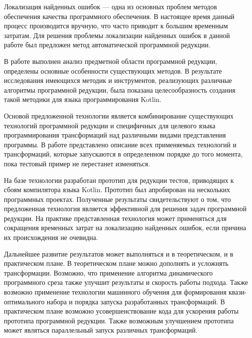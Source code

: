 \conclusion
Локализация найденных ошибок --- одна из основных проблем методов обеспечения качества программного обеспечения. В настоящее время данный процесс производится вручную, что часто приводит к большим временным затратам. Для решения проблемы локализации найденных ошибок в данной работе был предложен метод автоматической программной редукции.

В работе выполнен анализ предметной области программной редукции, определены основные особенности существующих методов. В результате исследования имеющихся методик и инструментов, реализующих различные алгоритмы программной редукции, была показана целесообразность создания такой методики для языка программирования Kotlin.

Основой предложенной технологии является комбинирование существующих технологий программной редукции и специфичных для целевого языка программирования трансформаций над различными видами представления программы. В работе представлено описание всех применяемых технологий и трансформаций, которые запускаются в определенном порядке до того момента, пока тестовый пример не перестанет изменяться.

На базе технологии разработан прототип для редукции тестов, приводящих к сбоям компилятора языка Kotlin. Прототип был апробирован на нескольких программных проектах. Полученные результаты свидетельствуют о том, что предложенная технология является эффективной для решения задач программной редукции. На практике представленная технология может применяться для сокращения временных затрат на локализацию найденных ошибок, если причина их происхождения не очевидна. 

Дальнейшее развитие результатов может выполняться и в теоретическом, и в практическом плане. В теоретическом плане можно дополнять и усложнять трансформации. Возможно, что применение алгоритма динамического программного среза также улучшит результаты и скорость работы подхода. Также возможно применение технологии машинного обучения для формирования квази-оптимального набора и порядка запуска разработанных трансформаций. В практическом плане возможно усовершенствование кода для ускорения работы прототипа программной редукции. Также возможным улучшением прототипа может являться параллельный запуск различных трансформаций.
